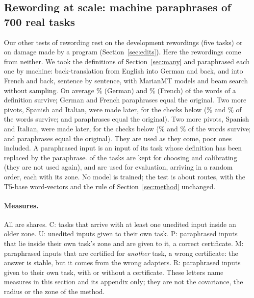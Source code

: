 \subsection{Rewording at scale: machine paraphrases of 700 real tasks}
\label{sec:paraphrase}

Our other tests of rewording rest on the development rewordings (five tasks) or on
damage made by a program (Section~\ref{sec:edits}). Here the rewordings come from neither. We took
the \WidenTasksAll{} definitions of Section~\ref{sec:many} and paraphrased each one by machine: back-translation
from English into German and back, and into French and back, sentence by sentence, with MarianMT
models \citep{junczys2018marian,tiedemann2020opusmt} and beam search without sampling. On average
\WidenKeptDe{}\% (German) and \WidenKeptFr{}\% (French) of the words of a definition survive; \WidenSameDe{}
German and \WidenSameFr{} French paraphrases equal the original. Two more pivots, Spanish and Italian, were made later, for the checks below (\WidenSpKept{}\% and \RerouteItKept{}\% of the words survive; \WidenSpSame{} and \RerouteItSame{} paraphrases equal the original). Two more pivots, Spanish and Italian, were made later, for the checks below (\WidenSpKept{}\% and \RerouteItKept{}\% of the words survive; \WidenSpSame{} and \RerouteItSame{} paraphrases equal the original). They are used as they come, poor
ones included. A paraphrased input is an input of its task whose definition has been replaced by the
paraphrase. \WidenTasksCal{} of the tasks are kept for choosing and calibrating (they are not used
again), and \WidenTasksEval{} are used for evaluation, arriving in a random order, each with its
zone. No model is trained; the test is about routes, with the T5-base word-vectors and the rule of
Section~\ref{sec:method} unchanged.

\paragraph{Measures.} All are shares. \textsf{C}: tasks that arrive with at least one unedited input inside an
older zone. \textsf{U}: unedited inputs given to their own task. \textsf{P}: paraphrased inputs that lie inside their
own task's zone and are given to it, a correct certificate. \textsf{M}: paraphrased inputs that are certified
for \emph{another} task, a wrong certificate: the answer is stable, but it comes from the wrong
adapters. \textsf{R}: paraphrased inputs given to their own task, with or without a certificate. These letters name measures in this section and its appendix only; they are not the covariance, the radius or the zone of the method.


